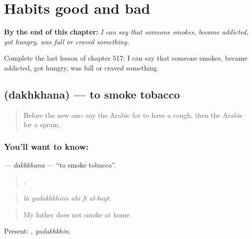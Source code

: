 
\chapter{Habits good and bad}
\label{ch:ar-habits-good-and-bad}

\begin{chapteropening}
\textbf{By the end of this chapter:} \emph{I can say that someone smokes, became addicted, got hungry, was full or craved something.}

Complete the last lesson of chapter 517: I can say that someone smokes, became addicted, got hungry, was full or craved something.
\end{chapteropening}

\section[\texorpdfstring{\ar{دخن} (dakhkhana)}{دخن (dakhkhana)}]{ (dakhkhana) — to smoke tobacco}

\label{lesson:AR-C517-dakhkhana}



\begin{quote}
Before the new one: say the Arabic for to have a cough, then the Arabic for a sprain.
\end{quote}

\subsection*{You'll want to know: }
\textbf{} — \emph{dakhkhana} — \textquotedblleft{}to smoke tobacco\textquotedblright{}.

\begin{quote}
    .
\end{quote}

\begin{quote}
\emph{lā yudakhkhinu abī fī al-bayt.}
\end{quote}

\begin{quote}
My father does not smoke at home.
\end{quote}

Present: , \emph{yudakhkhin}.

